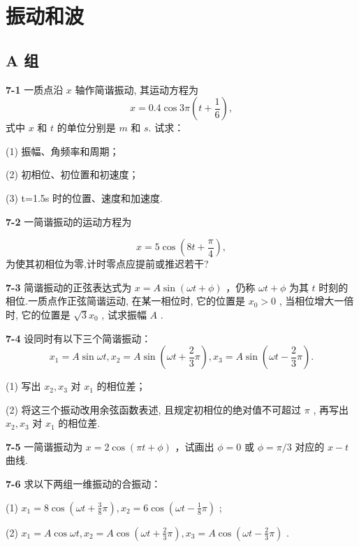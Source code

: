 \chapter{振动和波}

\section*{A 组}
\vspace{0.3cm}
\textbf{7-1} 一质点沿 $x$ 轴作简谐振动, 其运动方程为
\[
x = 0. 4 \cos 3 \pi \left(t + \frac {1}{6}\right),
\]
式中 $x$ 和 $t$ 的单位分别是 $m$ 和 $s$. 试求：

(1) 振幅、角频率和周期；

(2) 初相位、初位置和初速度；

(3) t=1.5s 时的位置、速度和加速度.

\vfill

\textbf{7-2} 一简谐振动的运动方程为

\[
x = 5 \cos \left(8 t + \frac {\pi}{4}\right),
\]
为使其初相位为零,计时零点应提前或推迟若干?

\vfill

\newpage

\textbf{7-3} 简谐振动的正弦表达式为 $x = A \sin(\omega t + \phi)$ ，仍称 $\omega t + \phi$ 为其 $t$ 时刻的相位.一质点作正弦简谐运动, 在某一相位时, 它的位置是 $x_0 > 0$ , 当相位增大一倍时, 它的位置是 $\sqrt{3} x_0$ , 试求振幅 $A$ .

\vfill

\textbf{7-4} 设同时有以下三个简谐振动：
\[
x _ {1} = A \sin \omega t,x _ {2} = A \sin \left(\omega t + \frac {2}{3} \pi\right),x _ {3} = A \sin \left(\omega t - \frac {2}{3} \pi\right).
\]

(1) 写出 $x_{2}, x_{3}$ 对 $x_{1}$ 的相位差；

(2) 将这三个振动改用余弦函数表述, 且规定初相位的绝对值不可超过 $\pi$ , 再写出 $x_{2}, x_{3}$ 对 $x_{1}$ 的相位差.

\vfill

\newpage

\textbf{7-5} 一简谐振动为 $x = 2\cos (\pi t + \phi)$ ，试画出 $\phi = 0$ 或 $\phi = \pi /3$ 对应的 $x - t$ 曲线.

\vfill

\textbf{7-6} 求以下两组一维振动的合振动：

(1) $x_{1} = 8\cos \left(\omega t + \frac{3}{8}\pi\right), x_{2} = 6\cos \left(\omega t - \frac{1}{8}\pi\right)$ ;

(2) $x_{1} = A\cos \omega t, x_{2} = A\cos \left(\omega t + \frac{2}{3}\pi\right), x_{3} = A\cos \left(\omega t - \frac{2}{3}\pi\right)$ .

